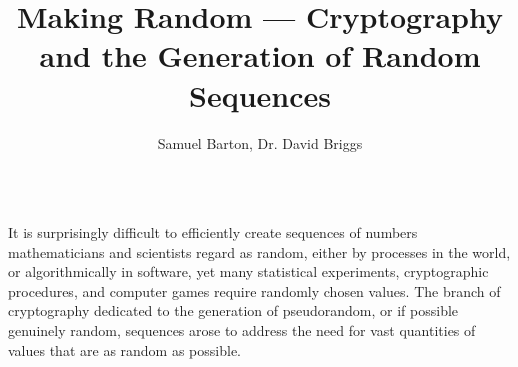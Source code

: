\documentclass[24pt, landscape]{tikzposter}
\title{Making Random --- Cryptography and the Generation of Random Sequences}
\author{Samuel Barton, Dr. David Briggs}
\institute{University of Southern Maine}
\begin{document}
\maketitle[titletotopverticalspace=1cm]

\begin{columns}
	{
It is surprisingly difficult to efficiently create sequences of numbers mathematicians and scientists regard as random, either by processes in the world, or algorithmically in software, yet many statistical experiments, cryptographic procedures, and computer games require randomly chosen values.  The branch of cryptography dedicated to the generation of pseudorandom, or if possible genuinely random, sequences arose to address the need for vast quantities of values that are as random as possible. \\

}
\end{columns}
\end{document}
